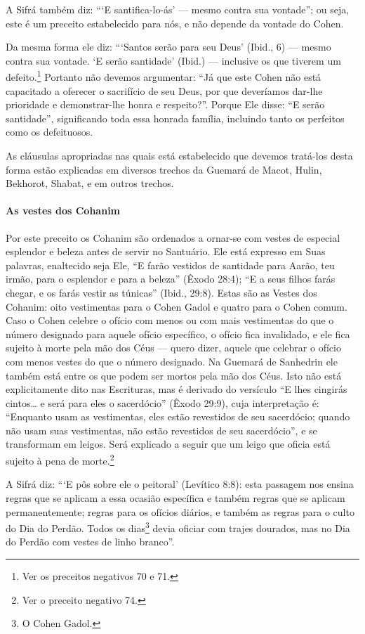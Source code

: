 A Sifrá também diz: ```E santifica-lo-ás' --- mesmo contra sua
vontade''; ou seja, este é um preceito estabelecido para nós, e não
depende da vontade do Cohen.

Da mesma forma ele diz: ```Santos serão para seu Deus' (Ibid., 6) ---
mesmo contra sua vontade. `E serão santidade' (Ibid.) --- inclusive os
que tiverem um defeito.\footnote{Ver os preceitos negativos 70 e 71.} Portanto não devemos argumentar:
``Já que este Cohen não está capacitado a oferecer o sacrifício de seu Deus, por que deveríamos dar-lhe prioridade e demonstrar-lhe honra e respeito?''. Porque Ele
disse: ``E serão santidade'', significando toda essa honrada família, incluindo tanto os
perfeitos como os defeituosos.

As cláusulas apropriadas nas quais está estabelecido que devemos
tratá-los desta forma estão explicadas em diversos trechos da Guemará de
Macot, Hulin, Bekhorot, Shabat, e em outros trechos.

\paragraph{As vestes dos Cohanim}


Por este preceito os Cohanim são ordenados a ornar-se com vestes de
especial esplendor e beleza antes de servir no Santuário. Ele está
expresso em Suas palavras, enaltecido seja Ele, ``E farão vestidos de
santidade para Aarão, teu irmão, para o esplendor e para a beleza'' (Êxodo 28:4); ``E a
seus filhos farás chegar, e os farás vestir as túnicas'' (Ibid., 29:8). Estas
são as Vestes dos Cohanim: oito vestimentas para o Cohen
Gadol e quatro para o
Cohen comum. Caso o Cohen celebre o ofício com menos ou com mais
vestimentas do que o número designado para aquele ofício específico, o
ofício fica invalidado, e ele fica sujeito à morte pela mão dos Céus ---
quero dizer, aquele que celebrar o ofício com menos vestes do que o
número designado. Na Guemará de Sanhedrin ele também está entre os que
podem ser mortos pela mão dos Céus. Isto não está explicitamente dito
nas Escrituras, mas é derivado do versículo ``E lhes cingirás cintos\ldots{}
e será para eles o sacerdócio'' (Êxodo 29:9), cuja interpretação é:
``Enquanto usam as vestimentas, eles estão revestidos de seu sacerdócio; quando não usam suas vestimentas, não estão
revestidos de seu sacerdócio'', e se transformam em leigos. Será explicado a
seguir que um leigo que oficia está sujeito à pena de
morte.\footnote{Ver o preceito negativo 74.}

A Sifrá diz: ```E pôs sobre ele o peitoral' (Levítico 8:8): esta passagem nos ensina regras que se aplicam a essa ocasião específica e também regras
que se aplicam permanentemente; regras para os ofícios diários, e também
as regras para o culto do Dia do Perdão. Todos os dias\footnote{O Cohen Gadol.}
devia oficiar com trajes dourados, mas no Dia do Perdão com vestes de linho branco''.

